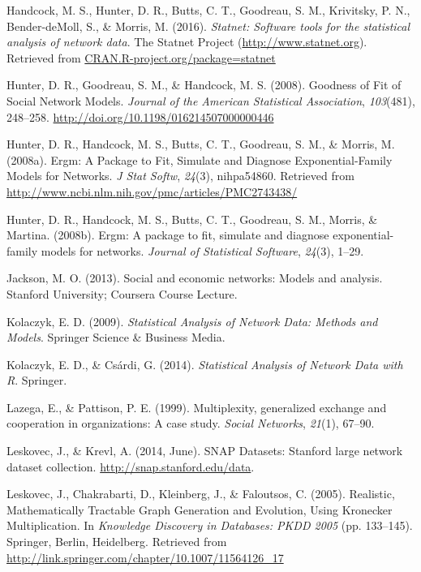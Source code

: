 \documentclass[12pt,twoside]{amherstthesis}
\begin{document}
  \hypertarget{ref-statnetpackagemanual}{}
  Handcock, M. S., Hunter, D. R., Butts, C. T., Goodreau, S. M.,
  Krivitsky, P. N., Bender-deMoll, S., \& Morris, M. (2016).
  \emph{Statnet: Software tools for the statistical analysis of network
  data}. The Statnet Project (\url{http://www.statnet.org}). Retrieved
  from \url{CRAN.R-project.org/package=statnet}
  
  \hypertarget{ref-hunter_goodness_2008}{}
  Hunter, D. R., Goodreau, S. M., \& Handcock, M. S. (2008). Goodness of
  Fit of Social Network Models. \emph{Journal of the American Statistical
  Association}, \emph{103}(481), 248--258.
  \url{http://doi.org/10.1198/016214507000000446}
  
  \hypertarget{ref-hunter_ergm:_2008}{}
  Hunter, D. R., Handcock, M. S., Butts, C. T., Goodreau, S. M., \&
  Morris, M. (2008a). Ergm: A Package to Fit, Simulate and Diagnose
  Exponential-Family Models for Networks. \emph{J Stat Softw},
  \emph{24}(3), nihpa54860. Retrieved from
  \url{http://www.ncbi.nlm.nih.gov/pmc/articles/PMC2743438/}
  
  \hypertarget{ref-ergmpackagearticle}{}
  Hunter, D. R., Handcock, M. S., Butts, C. T., Goodreau, S. M., Morris,
  \& Martina. (2008b). Ergm: A package to fit, simulate and diagnose
  exponential-family models for networks. \emph{Journal of Statistical
  Software}, \emph{24}(3), 1--29.
  
  \hypertarget{ref-jacksonergms2013}{}
  Jackson, M. O. (2013). Social and economic networks: Models and
  analysis. Stanford University; Coursera Course Lecture.
  
  \hypertarget{ref-kolaczyk_statistical_2009}{}
  Kolaczyk, E. D. (2009). \emph{Statistical Analysis of Network Data:
  Methods and Models}. Springer Science \& Business Media.
  
  \hypertarget{ref-kolaczyk_statistical_2014}{}
  Kolaczyk, E. D., \& Csárdi, G. (2014). \emph{Statistical Analysis of
  Network Data with R}. Springer.
  
  \hypertarget{ref-lazega1999multiplexity}{}
  Lazega, E., \& Pattison, P. E. (1999). Multiplexity, generalized
  exchange and cooperation in organizations: A case study. \emph{Social
  Networks}, \emph{21}(1), 67--90.
  
  \hypertarget{ref-snapnets}{}
  Leskovec, J., \& Krevl, A. (2014, June). SNAP Datasets: Stanford large
  network dataset collection. \url{http://snap.stanford.edu/data}.
  
  \hypertarget{ref-leskovec_realistic_2005}{}
  Leskovec, J., Chakrabarti, D., Kleinberg, J., \& Faloutsos, C. (2005).
  Realistic, Mathematically Tractable Graph Generation and Evolution,
  Using Kronecker Multiplication. In \emph{Knowledge Discovery in
  Databases: PKDD 2005} (pp. 133--145). Springer, Berlin, Heidelberg.
  Retrieved from
  \url{http://link.springer.com/chapter/10.1007/11564126_17}
  
\end{document}
